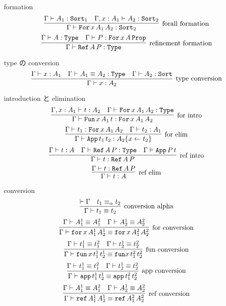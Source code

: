 \begin{itembox}[l]{formation}
  \[\infer[\text{forall formation}]{\Gamma \vdash \texttt{For} \, x \, A_1 \, A_2 : \texttt{Sort}_2}{\Gamma \vdash A_1 : \texttt{Sort}_1 & \Gamma , x : A_1 \vdash A_2 : \texttt{Sort}_2 }\]
  \[\infer[\text{refinement formation}]{\Gamma \vdash \texttt{Ref} \, A \, P : \texttt{Type}}{\Gamma \vdash A : \texttt{Type} & \Gamma \vdash P : \texttt{For} \, x \, A \, \texttt{Prop}}\]
\end{itembox}

\begin{itembox}[l]{type の conversion}
  \[\infer[\text{type conversion}]{\Gamma \vdash x : A_2}{\Gamma \vdash x : A_1 & \Gamma \vdash A_1 \equiv A_2 : \texttt{Type} & \Gamma \vdash A_2 : \texttt{Sort}} \]
\end{itembox}

\begin{itembox}[l]{introduction と elimination}
  \[\infer[\text{for intro}]{\Gamma \vdash \texttt{Fun} \, x \, A_1 \, t : \texttt{For} \, x \, A_1 \, A_2}{\Gamma , x : A_1 \vdash t : A_2 & \Gamma \vdash \texttt{For} \, x \, A_1 \, A_2 : \texttt{Type}}\]
  \[\infer[\text{for elim}]{\Gamma \vdash \texttt{App} \, t_1 \, t_2 : A_2\{x \leftarrow t_2\}}{\Gamma \vdash t_1 : \texttt{For} \, x \, A_1 \, A_2 & \Gamma \vdash t_2 : A_1}\]
  \[\infer[\text{ref intro}]{\Gamma \vdash t : \texttt{Ref} \, A \, P}{\Gamma \vdash t : A & \Gamma \vdash \texttt{Ref} \, A \, P : \texttt{Type} & \Gamma \vDash \texttt{App} \, P \, t} \]
  \[\infer[\text{ref elim}]{\Gamma \vdash t : A}{\Gamma \vdash t : \texttt{Ref} \, A \, P} \]
\end{itembox}

\begin{itembox}[l]{conversion}
  \[\infer[\text{conversion alpha}]{\Gamma \vdash t_1 \equiv t_2}{\vdash \Gamma & t_1 \equiv_{\alpha} t_2}\]
  \[\infer[\text{for conversion}]{\Gamma \vdash \texttt{for} \, x \, A^1_1 \, A^1_2 \equiv \texttt{for} \, x \, A^2_1 \, A^2_2}{\Gamma \vdash A^1_1 \equiv A^2_1 & \Gamma \vdash A^1_2 \equiv A^2_2}\]
  \[\infer[\text{fun conversion}]{\Gamma \vdash \texttt{fun} \, x \, t^1_1 \, t^1_2 \equiv \texttt{fun} x \, t^2_1 \, t^2_2}{\Gamma \vdash t^1_1 \equiv t^2_1 & \Gamma \vdash t^1_2 \equiv t^2_2}\]
  \[\infer[\text{app conversion}]{\Gamma \vdash \texttt{app} \, t^1_1 \, t^1_2 \equiv \texttt{app} \, t^2_1 \, t^2_2}{\Gamma \vdash t^1_1 \equiv t^2_1 & \Gamma \vdash t^1_2 \equiv t^2_2}\]
  \[\infer[\text{ref conversion}]{\Gamma \vdash \texttt{ref} \, A^1_1 \, A^1_2 \equiv \texttt{ref} \, A^2_1 \, A^2_2}{\Gamma \vdash A^1_1 \equiv A^2_1 & \Gamma \vdash A^1_2 \equiv A^2_2}\]
\end{itembox}

